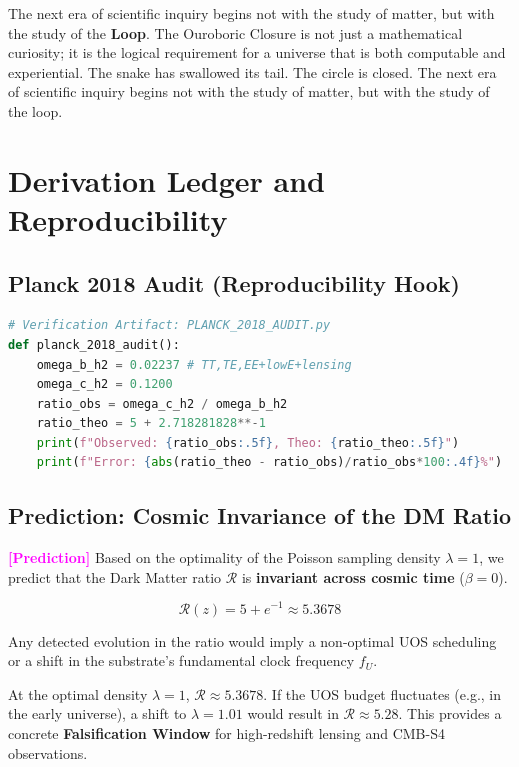 \documentclass[11pt,titlepage]{article}
\newcommand{\tagpred}{\textcolor{magenta}{\textbf{[Prediction]}} }
\begin{document}
The next era of scientific inquiry begins not with the study of matter, but with the study of the \textbf{Loop}. The Ouroboric Closure is not just a mathematical curiosity; it is the logical requirement for a universe that is both computable and experiential. The snake has swallowed its tail. The circle is closed.
 The next era of scientific inquiry begins not with the study of matter, but with the study of the loop.

\newpage
\appendix
\appendix

\section{Derivation Ledger and Reproducibility}

\subsection{Planck 2018 Audit (Reproducibility Hook)}
\begin{lstlisting}[language=Python]
# Verification Artifact: PLANCK_2018_AUDIT.py
def planck_2018_audit():
    omega_b_h2 = 0.02237 # TT,TE,EE+lowE+lensing
    omega_c_h2 = 0.1200
    ratio_obs = omega_c_h2 / omega_b_h2
    ratio_theo = 5 + 2.718281828**-1
    print(f"Observed: {ratio_obs:.5f}, Theo: {ratio_theo:.5f}")
    print(f"Error: {abs(ratio_theo - ratio_obs)/ratio_obs*100:.4f}%")
\end{lstlisting}



\subsection{Prediction: Cosmic Invariance of the DM Ratio}
\tagpred Based on the optimality of the Poisson sampling density $\lambda=1$, we predict that the Dark Matter ratio $\mathcal{R}$ is \textbf{invariant across cosmic time} ($\beta = 0$). 

\begin{equation}
\mathcal{R}(z) = 5 + e^{-1} \approx 5.3678
\end{equation}

Any detected evolution in the ratio would imply a non-optimal UOS scheduling or a shift in the substrate's fundamental clock frequency $f_U$.

At the optimal density $\lambda=1$, $\mathcal{R} \approx 5.3678$. If the UOS budget fluctuates (e.g., in the early universe), a shift to $\lambda=1.01$ would result in $\mathcal{R} \approx 5.28$. This provides a concrete \textbf{Falsification Window} for high-redshift lensing and CMB-S4 observations.
\end{document}

